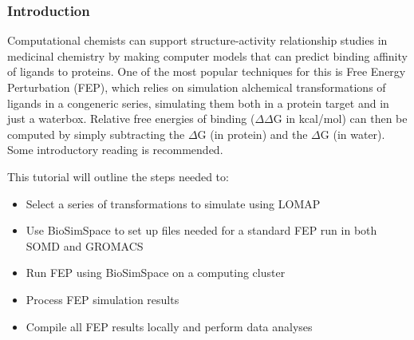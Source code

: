 
\subsubsection{Introduction}


Computational chemists can support structure-activity relationship
studies in medicinal chemistry by making computer models that can
predict binding affinity of ligands to proteins. One of the most popular
techniques for this is Free Energy Perturbation (FEP), which relies on
simulation alchemical transformations of ligands in a congeneric series,
simulating them both in a protein target and in just a waterbox.
Relative free energies of binding ($\Delta\Delta$G in kcal/mol) can then be computed
by simply subtracting the $\Delta$G (in protein) and the $\Delta$G (in water). Some
introductory reading is recommended. \cite{mey2020best, cournia_allen_sherman_2017, kuhn_firth-clark_tosco_mey_mackey_michel_2020}

This tutorial will outline the steps needed to:

\begin{itemize}
\item
  Select a series of transformations to simulate using LOMAP
\item
  Use BioSimSpace to set up files needed for a standard FEP run in both
  SOMD and GROMACS
\item
  Run FEP using BioSimSpace on a computing cluster
\item
  Process FEP simulation results
\item
  Compile all FEP results locally and perform data analyses
\end{itemize}

